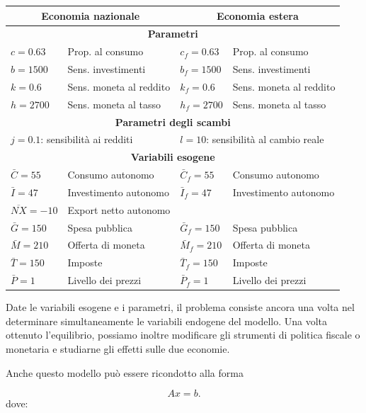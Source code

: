 \begin{center}
\scriptsize
\renewcommand{\arraystretch}{1.15}
\begin{tabular}{ll|ll}
\hline
\multicolumn{2}{c|}{\textbf{Economia nazionale}} &
\multicolumn{2}{c}{\textbf{Economia estera}}\\
\hline
\multicolumn{4}{c}{\textbf{Parametri}}\\
\hline
$c=0.63$ & Prop. al consumo &
$c_f=0.63$ & Prop. al consumo\\
$b=1500$ & Sens. investimenti &
$b_f=1500$ & Sens. investimenti\\
$k=0.6$ & Sens. moneta al reddito &
$k_f=0.6$ & Sens. moneta al reddito\\
$h=2700$ & Sens. moneta al tasso &
$h_f=2700$ & Sens. moneta al tasso\\
\hline
\multicolumn{4}{c}{\textbf{Parametri degli scambi}}\\
\hline
\multicolumn{2}{l|}{$j=0.1$: sensibilità ai redditi} &
\multicolumn{2}{l}{$l=10$: sensibilità al cambio reale}\\
\hline
\multicolumn{4}{c}{\textbf{Variabili esogene}}\\
\hline
$\bar C=55$ & Consumo autonomo &
$\bar C_f=55$ & Consumo autonomo\\
$\bar I=47$ & Investimento autonomo &
$\bar I_f=47$ & Investimento autonomo\\
$\overline{NX}=-10$ & Export netto autonomo &
&\\
$\bar G=150$ & Spesa pubblica &
$\bar G_f=150$ & Spesa pubblica\\
$\bar M=210$ & Offerta di moneta &
$\bar M_f=210$ & Offerta di moneta\\
$\bar T=150$ & Imposte &
$\bar T_f=150$ & Imposte\\
$\bar P=1$ & Livello dei prezzi &
$\bar P_f=1$ & Livello dei prezzi\\
\hline
\end{tabular}
\end{center}

Date le variabili esogene e i parametri, il problema consiste
ancora una volta nel determinare simultaneamente le variabili
endogene del modello. Una volta ottenuto l'equilibrio, possiamo
inoltre modificare gli strumenti di politica fiscale o monetaria
e studiarne gli effetti sulle due economie.

Anche questo modello può essere ricondotto alla forma

\begin{equation*}
    Ax=b.
\end{equation*}
dove:

